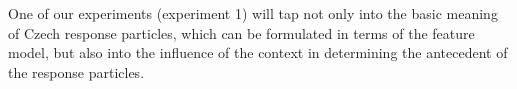 \documentclass[output=paper,colorlinks,citecolor=brown]{langscibook}
\begin{document}
\noindent One of our experiments (experiment 1) will tap not only into the basic meaning of Czech response particles, which can be formulated in terms of the feature model, but also into the influence of the context in determining the antecedent of the response particles.





\end{document}
